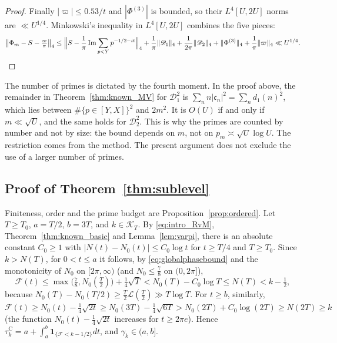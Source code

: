 \documentclass[11pt,a4paper]{article}
\makeatletter
\numberwithin{equation}{section}
\DeclareRobustCommand{\CGref}[1]{\ref{#1}}
\DeclareRobustCommand{\CGeqref}[1]{\eqref{#1}}
\let\CG@origref\ref
\let\CG@origeqref\eqref
\newcommand{\CG@gettip}[1]{\@ifundefined{CGTip@#1}{#1}{\csname CGTip@#1\endcsname}}
\DeclareRobustCommand{\CGref}[1]{\pdftooltip{\CG@origref{#1}}{\CG@gettip{#1}}}
\DeclareRobustCommand{\CGeqref}[1]{\pdftooltip{\CG@origeqref{#1}}{\CG@gettip{#1}}}
\theoremstyle{definition}
\theoremstyle{remark}
\newcommand{\Nz}{N_0} %
\newcommand{\lL}{\mathcal L}
\newcommand{\Fc}{\mathcal F}
\newcommand{\Ph}{\Phi}
\newcommand{\Ind}{\mathbf 1}
\newcommand{\Kc}{\mathcal K}
\makeatother
\begin{document}
\begin{proof}
Finally $|\varpi|\le0.53/t$ and $|\Ph^{(3)}|$ is bounded, so their $L^4[U,2U]$ norms are $\ll U^{1/4}$. Minkowski's inequality in $L^4[U,2U]$ combines the five pieces:
\begin{equation}
\bigl\|\Ph_m-S-\tfrac{\varpi}\pi\bigr\|_4\le\Bigl\|S-\frac1\pi\operatorname{Im}\sum_{p<Y}p^{-1/2-it}\Bigr\|_4+\frac1\pi\|\mathscr D_1\|_4+\frac1{2\pi}\|\mathscr D_2\|_4+\|\Ph^{(3)}\|_4+\frac1\pi\|\varpi\|_4\ll U^{1/4}.
\label{eq:disp_26}
\end{equation}
\end{proof}

The number of primes is dictated by the fourth moment. In the proof above, the remainder in Theorem~\CGref{thm:known_MV} for $\mathscr D_1^2$ is $\sum_nn|\mathfrak c_n|^2=\sum_nd_1(n)^2$, which lies between $\#\{p\in[Y,X]\}^2$ and $2m^2$. It is $O(U)$ if and only if $m\ll\sqrt U$, and the same holds for $\mathscr D_2^2$. This is why the primes are counted by number and not by size: the bound depends on $m$, not on $p_m\asymp\sqrt U\log U$. The restriction comes from the method. The present argument does not exclude the use of a larger number of primes.

\subsection{Proof of Theorem~\ref{thm:sublevel}}\label{subsec:proof_sublevel}
Finiteness, order and the prime budget are Proposition~\CGref{prop:ordered}. Let $T\ge T_0$, $a=T/2$, $b=3T$, and $k\in\Kc_T$. By \CGeqref{eq:intro_RvM}, Theorem~\CGref{thm:known_basic} and Lemma~\CGref{lem:varpi}, there is an absolute constant $C_0\ge1$ with $|N(t)-\Nz(t)|\le C_0\log t$ for $t\ge T/4$ and $T\ge T_0$. Since $k>N(T)$, for $0<t\le a$ it follows, by \CGeqref{eq:globalphasebound} and the monotonicity of $\Nz$ on $[2\pi,\infty)$ (and $\Nz\le\frac78$ on $(0,2\pi]$),
\begin{equation}
\Fc(t)\le\max\bigl(\tfrac78,\Nz(\tfrac T2)\bigr)+\tfrac14\sqrt T<\Nz(T)-C_0\log T\le N(T)<k-\tfrac12,
\label{eq:disp_27}
\end{equation}
because $\Nz(T)-\Nz(T/2)\ge\frac T2\lL(\frac T2)\gg T\log T$. For $t\ge b$, similarly, $\Fc(t)\ge\Nz(t)-\frac14\sqrt{2t}\ge\Nz(3T)-\frac14\sqrt{6T}>\Nz(2T)+C_0\log(2T)\ge N(2T)\ge k$ (the function $\Nz(t)-\frac14\sqrt{2t}$ increases for $t\ge2\pi e$). Hence $\tau_{k}^{\mathrm C}=a+\int_a^b\Ind_{\{\Fc<k-1/2\}}dt$, and $\gamma_k\in(a,b]$.
\end{document}
